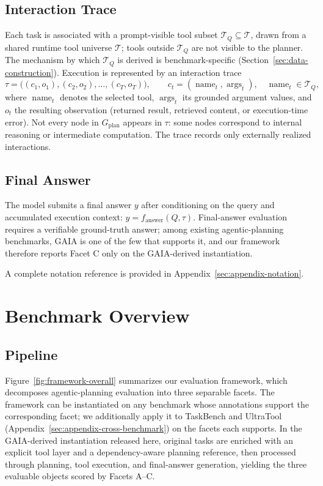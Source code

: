 \documentclass{article}
\begin{document}
\subsection{Interaction Trace}
Each task is associated with a prompt-visible tool subset $\mathcal{T}_Q \subseteq \mathcal{T}$, drawn from a shared runtime tool universe $\mathcal{T}$; tools outside $\mathcal{T}_Q$ are not visible to the planner. The mechanism by which $\mathcal{T}_Q$ is derived is benchmark-specific (Section~\ref{sec:data-construction}). Execution is represented by an interaction trace
\[
\tau = \bigl((c_1, o_1), (c_2, o_2), \dots, (c_T, o_T)\bigr),
\qquad
c_t = (\operatorname{name}_t, \operatorname{args}_t),
\quad
\operatorname{name}_t \in \mathcal{T}_Q,
\]
where $\operatorname{name}_t$ denotes the selected tool, $\operatorname{args}_t$ its grounded argument values, and $o_t$ the resulting observation (returned result, retrieved content, or execution-time error). Not every node in $G_{\text{plan}}$ appears in $\tau$: some nodes correspond to internal reasoning or intermediate computation. The trace records only externally realized interactions.

\subsection{Final Answer}
The model submits a final answer $y$ after conditioning on the query and accumulated execution context: $y = f_{\text{answer}}(Q, \tau)$. Final-answer evaluation requires a verifiable ground-truth answer; among existing agentic-planning benchmarks, GAIA is one of the few that supports it, and our framework therefore reports Facet C only on the GAIA-derived instantiation.

A complete notation reference is provided in Appendix~\ref{sec:appendix-notation}.


\section{Benchmark Overview}

\subsection{Pipeline}
\label{subsec:benchmark-pipeline}
Figure~\ref{fig:framework-overall} summarizes our evaluation framework, which decomposes agentic-planning evaluation into three separable facets. The framework can be instantiated on any benchmark whose annotations support the corresponding facet; we additionally apply it to TaskBench and UltraTool (Appendix~\ref{sec:appendix-cross-benchmark}) on the facets each supports. In the GAIA-derived instantiation released here, original tasks are enriched with an explicit tool layer and a dependency-aware planning reference, then processed through planning, tool execution, and final-answer generation, yielding the three evaluable objects scored by Facets A--C.
\end{document}
